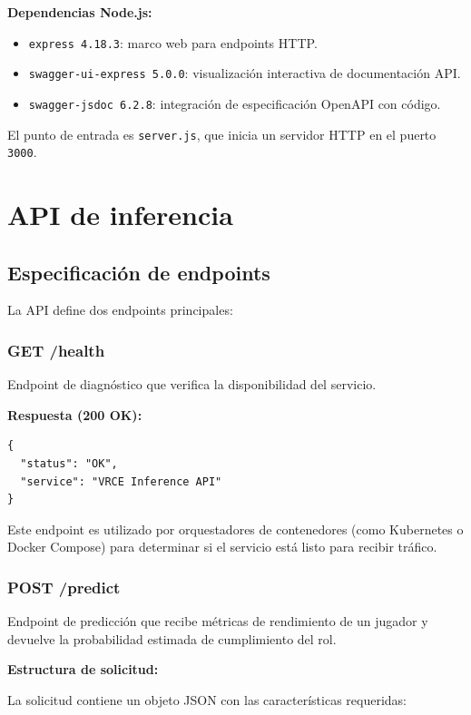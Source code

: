 \documentclass{ULBreport} %
\begin{document}
\textbf{Dependencias Node.js:}
\begin{itemize}
    \item \texttt{express 4.18.3}: marco web para endpoints HTTP.
    \item \texttt{swagger-ui-express 5.0.0}: visualización interactiva de documentación API.
    \item \texttt{swagger-jsdoc 6.2.8}: integración de especificación OpenAPI con código.
\end{itemize}

El punto de entrada es \texttt{server.js}, que inicia un servidor HTTP en el puerto \texttt{3000}.

\section{API de inferencia}

\subsection{Especificación de endpoints}

La API define dos endpoints principales:

\subsubsection{GET /health}

Endpoint de diagnóstico que verifica la disponibilidad del servicio.

\textbf{Respuesta (200 OK):}
\begin{verbatim}
{
  "status": "OK",
  "service": "VRCE Inference API"
}
\end{verbatim}

Este endpoint es utilizado por orquestadores de contenedores (como Kubernetes o Docker Compose) para determinar si el servicio está listo para recibir tráfico.

\subsubsection{POST /predict}

Endpoint de predicción que recibe métricas de rendimiento de un jugador y devuelve la probabilidad estimada de cumplimiento del rol.

\textbf{Estructura de solicitud:}

La solicitud contiene un objeto JSON con las características requeridas:
\end{document}
